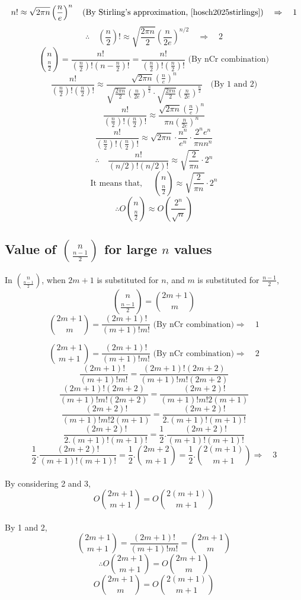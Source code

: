 \[ n! \approx \sqrt{2 \pi n} \left( \frac{n}{e} \right)^n \quad \text{(By Stirling's approximation, \cite{hosch2025stirlings})} \quad \Rightarrow \quad 1 \]
\[ \therefore \quad \left( \frac{n}{2} \right)! \approx \sqrt{\frac{2 \pi n}{2}} \left( \frac{n}{2e} \right)^{n/2} \quad \Rightarrow \quad 2 \]
\[ \binom{n}{\frac{n}{2}} = \frac{n!}{(\frac{n}{2})! (n - \frac{n}{2})!} = \frac{n!}{(\frac{n}{2})! (\frac{n}{2})!} \text{ (By nCr combination)} \]
\[ \frac{n!}{(\frac{n}{2})! (\frac{n}{2})!} \approx \frac{\sqrt{2 \pi n} \left( \frac{n}{e} \right)^n}{\sqrt{\frac{2 \pi n}{2}} \left( \frac{n}{2e} \right)^{\frac{n}{2}} \cdot \sqrt{\frac{2 \pi n}{2}} \left( \frac{n}{2e} \right)^{\frac{n}{2}}} \quad \text{(By 1 and 2)} \]
\[ \frac{n!}{(\frac{n}{2})! (\frac{n}{2})!} \approx \frac{\sqrt{2 \pi n} \left( \frac{n}{e} \right)^n}{\pi n \left( \frac{n}{2e} \right)^n} \]
\[ \frac{n!}{(\frac{n}{2})! (\frac{n}{2})!} \approx \sqrt{2 \pi n} \cdot \frac{n^n}{e^n} \cdot \frac{2^n e^n}{\pi n n^n} \]
\[ \therefore \quad \frac{n!}{(n/2)! (n/2)!} \approx \sqrt{\frac{2}{\pi n}} \cdot 2^n \]
\[ \text{It means that, } \quad \binom{n}{\frac{n}{2}} \approx \sqrt{\frac{2}{\pi n}} \cdot 2^n \]
\[ \therefore O\binom{n}{\frac{n}{2}} \approx O(\frac{2^n}{\sqrt{n}}) \]

\subsection{Value of $\binom{n}{\frac{n-1}{2}}$ for large $n$ values} \label{proof: time complexity of nc((n-1)/2)}

In $\binom{n}{\frac{n-1}{2}}$, when $2m+1$ is substituted for $n$, and $m$ is substituted for $\frac{n-1}{2}$,
\[ \binom{n}{\frac{n-1}{2}} = \binom{2m+1}{m} \]
\[ \binom{2m+1}{m} = \frac{(2m+1)!}{(m+1)!m!} \text{ (By nCr combination)} \Rightarrow \quad 1 \]

\[ \binom{2m+1}{m+1} = \frac{(2m+1)!}{(m+1)!m!} \text{ (By nCr combination)} \Rightarrow \quad 2 \]
\[ \frac{(2m+1)!}{(m+1)!m!} = \frac{(2m+1)!(2m+2)}{(m+1)!m!(2m+2)} \]
\[ \frac{(2m+1)!(2m+2)}{(m+1)!m!(2m+2)} = \frac{(2m+2)!}{(m+1)!m!2(m+1)} \]
\[ \frac{(2m+2)!}{(m+1)!m!2(m+1)} = \frac{(2m+2)!}{2.(m+1)!(m+1)!} \]
\[ \frac{(2m+2)!}{2.(m+1)!(m+1)!} = \frac{1}{2}.\frac{(2m+2)!}{(m+1)!(m+1)!} \]
\[ \frac{1}{2}.\frac{(2m+2)!}{(m+1)!(m+1)!} = \frac{1}{2}.\binom{2m+2}{m+1}  = \frac{1}{2}.\binom{2(m+1)}{m+1} \Rightarrow \quad 3 \] \\

By considering 2 and 3,
\[ O\binom{2m+1}{m+1} = O\binom{2(m+1)}{m+1} \] \\
By 1 and 2,
\[ \binom{2m+1}{m+1} = \frac{(2m+1)!}{(m+1)!m!} = \binom{2m+1}{m} \]
\[ \therefore O\binom{2m+1}{m+1} = O\binom{2m+1}{m} \]
\[ O\binom{2m+1}{m} = O\binom{2(m+1)}{m+1} \] \\

